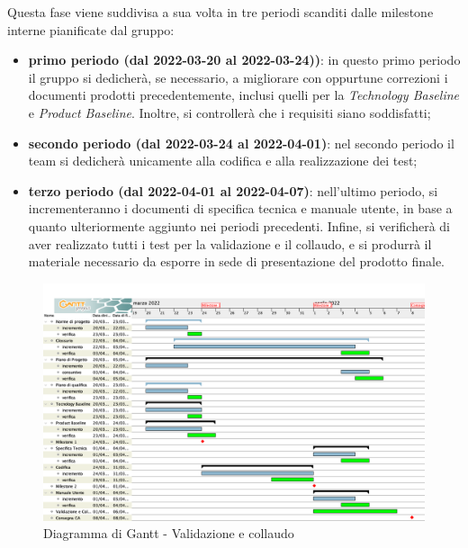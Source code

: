 Questa fase viene suddivisa a sua volta in tre periodi scanditi dalle milestone interne pianificate dal gruppo:
\begin{itemize}
	\item \textbf{primo periodo (dal 2022-03-20 al 2022-03-24))}: in questo primo periodo il gruppo si dedicherà,  se necessario,  a migliorare con oppurtune correzioni i documenti prodotti precedentemente,  inclusi quelli per la \textit{Technology Baseline} e \textit{Product Baseline}.  Inoltre,  si controllerà che i requisiti siano soddisfatti;
	\item \textbf{secondo periodo (dal 2022-03-24 al 2022-04-01)}: nel secondo periodo il team si dedicherà unicamente alla codifica e alla realizzazione dei test;
	\item \textbf{terzo periodo (dal 2022-04-01 al 2022-04-07)}: nell'ultimo periodo,  si incrementeranno i documenti di specifica tecnica e manuale utente,  in base a quanto ulteriormente aggiunto nei periodi precedenti.  Infine,  si verificherà di aver realizzato tutti i test per la validazione e il collaudo,  e si produrrà il materiale necessario da esporre in sede di presentazione del prodotto finale.
\end{itemize}

\begin{figure}[!h]
\centering
\includegraphics[scale=0.35]{Sezioni/gantt/validazione_collaudo.png}
\caption{Diagramma di Gantt - Validazione e collaudo}
\end{figure}